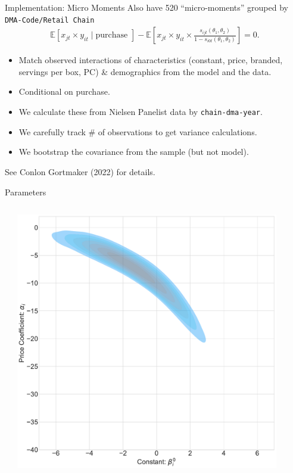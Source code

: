 \documentclass[handout, serif, aspectratio=169, 10pt]{beamer}
\begin{document}
\begin{frame}{Implementation: Micro Moments}
Also have 520 ``micro-moments'' grouped by \texttt{DMA-Code/Retail Chain}
\begin{align*}
\mathbb{E} \left[x_{jt} \times y_{it} \mid \text{purchase } \right] 
- \mathbb{E}\left[x_{jt} \times y_{it}  \times \frac{s_{ijt}(\theta_1,\theta_2)}{1-s_{i0t}(\theta_1,\theta_2)}  \right] = 0.
\end{align*}
\begin{itemize}
\item Match observed interactions of characteristics (constant, price, branded, servings per box, PC) \& demographics from the model and the data.
\item Conditional on purchase.
\item We calculate these from Nielsen Panelist data by \texttt{chain-dma-year}.
\item We carefully track \# of observations to get variance calculations.
\item We bootstrap the covariance from the sample (but not model).
\end{itemize}
See Conlon Gortmaker (2022) for details.
\end{frame}

\begin{frame}{Parameters}
\begin{columns}
\begin{column}{0.4\textwidth}
\scalebox{0.33}{

}
\end{column}
\begin{column}{0.6\textwidth}
\includegraphics[width=0.9\textwidth]{resources/2d_density_plot.pdf}
\end{column}
\end{columns}
\end{frame}
\end{document}

